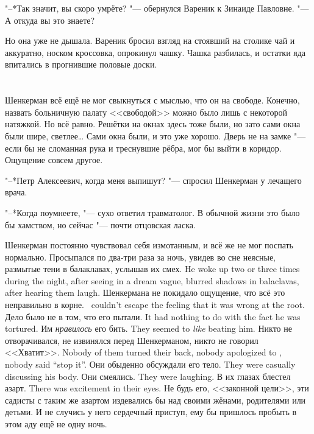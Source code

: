 "--*Так значит, вы скоро умрёте? "--- обернулся Вареник к Зинаиде Павловне.
"--- А откуда вы это знаете?

Но она уже не дышала.
Вареник бросил взгляд на стоявший на столике чай и аккуратно, носком кроссовка, опрокинул чашку.
Чашка разбилась, и остатки яда впитались в прогнившие половые доски.

\chapter{}

Шенкерман всё ещё не мог свыкнуться с мыслью, что он на свободе.
Конечно, назвать больничную палату <<свободой>> можно было лишь с некоторой натяжкой.
Но всё равно.
Решётки на окнах здесь тоже были, но зато сами окна были шире, светлее\ldots{}
Сами окна были, и это уже хорошо.
Дверь не на замке "--- если бы не сломанная рука и треснувшие рёбра, мог бы выйти в коридор.
Ощущение совсем другое.

"--*Петр Алексеевич, когда меня выпишут? "--- спросил Шенкерман у лечащего врача.

"--*Когда поумнеете, "--- сухо ответил травматолог.
В обычной жизни это было бы хамством, но сейчас "--- почти отцовская ласка.

Шенкерман постоянно чувствовал себя измотанным, и всё же не мог поспать нормально.
{Просыпался по два-три раза за ночь, увидев во сне неясные, размытые тени в балаклавах, услышав их смех.}
{He woke up two or three times during the night, after seeing in a dream vague, blurred shadows in balaclavas, after hearing them laugh.}
{Шенкермана не покидало ощущение, что всё это неправильно в корне.}
{\Shenkerman\ couldn't escape the feeling that it was wrong at the root.}
{Дело было не в том, что его пытали.}
{It had nothing to do with the fact he was tortured.}
{Им \emph{нравилось} его бить.}
{They seemed to \emph{like} beating him.}
{Никто не отворачивался, не извинялся перед Шенкерманом, никто не говорил <<Хватит>>.}
{Nobody of them turned their back, nobody apologized to \Shenkerman, nobody said ``stop it''.}
{Они обыденно обсуждали его тело.}
{They were casually discussing his body.}
{Они смеялись.}
{They were laughing.}
{В их глазах блестел азарт.}
{There was excitement in their eyes.}
Не будь его, <<законной цели>>, эти садисты с таким же азартом издевались бы над своими жёнами, родителями или детьми.
И не случись у него сердечный приступ, ему бы пришлось пробыть в этом аду ещё не одну ночь.

